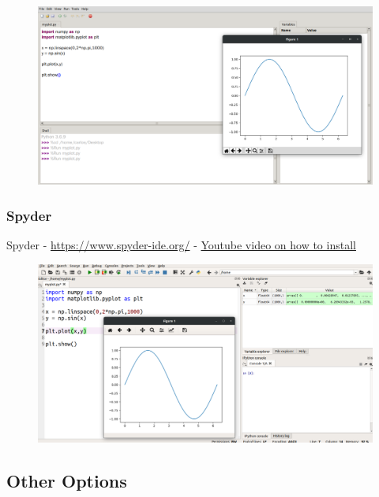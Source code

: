 \begin{figure}[H]
  \begin{center}
    \includegraphics[width=\textwidth]{Figures/Thonny.png}
  \end{center}
\end{figure}

\subsubsection{Spyder}

Spyder - \url{https://www.spyder-ide.org/} - \href{https://www.youtube.com/watch?v=OjYwET-6QtE&list=PL_D7_GvGz-v1RsDs_OdNW65qRjEjmpfQx&index=35}{Youtube video on how to install}

\begin{figure}[H]
  \begin{center}
    \includegraphics[width=\textwidth]{Figures/Spyder.png}
  \end{center}
\end{figure}

\subsection{Other Options}

